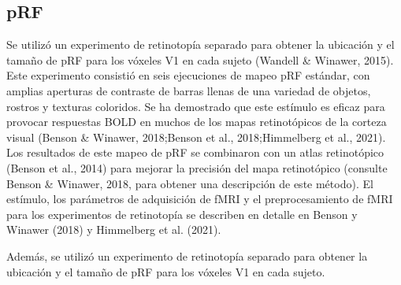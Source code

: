 \subsection{pRF}

Se utilizó un experimento de retinotopía separado para obtener la ubicación y el tamaño de pRF para los vóxeles V1 en cada sujeto (Wandell \& Winawer, 2015). Este experimento consistió en seis ejecuciones de mapeo pRF estándar, con amplias aperturas de contraste de barras llenas de una variedad de objetos, rostros y texturas coloridos. Se ha demostrado que este estímulo es eficaz para provocar respuestas BOLD en muchos de los mapas retinotópicos de la corteza visual (Benson \& Winawer, 2018;Benson et al., 2018;Himmelberg et al., 2021). Los resultados de este mapeo de pRF se combinaron con un atlas retinotópico (Benson et al., 2014) para mejorar la precisión del mapa retinotópico (consulte Benson \& Winawer, 2018, para obtener una descripción de este método). El estímulo, los parámetros de adquisición de fMRI y el preprocesamiento de fMRI para los experimentos de retinotopía se describen en detalle en Benson y Winawer (2018) y Himmelberg et al. (2021).

Adem\'as, se utilizó un experimento de retinotopía separado para obtener la ubicación y el tamaño de pRF para los vóxeles V1 en cada sujeto.







